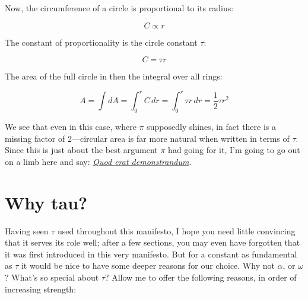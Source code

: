 \documentclass{article}
\begin{document}
Now, the circumference of a circle is proportional to its radius:

\[ C \propto r \]

\noindent The constant of proportionality is the circle constant $\tau$:

\[ C = \tau r \]

\noindent The area of the full circle in then the integral over all rings:

\[ A = \int dA = \int_0^r C\,dr = \int_0^r \tau r\,dr = \textstyle{\frac{1}{2}} \tau r^2 \]

\noindent 

We see that even in this case, where $\pi$ supposedly shines, in fact there is a missing factor of 2---circular area is far more natural when written in terms of $\tau$. Since this is just about the best argument $\pi$ had going for it, I'm going to go out on a limb here and say: \href{http://en.wikipedia.org/wiki/Q.E.D.}{\emph{Quod erat demonstrandum}}.




\section{Why tau?} %
\label{sec:why_tau}

Having seen $\tau$ used throughout this manifesto, I hope you need little convincing that it serves its role well; after a few sections, you may even have forgotten that it was first introduced in this very manifesto. But for a constant as fundamental as $\tau$ it would be nice to have some deeper reasons for our choice. Why not $\alpha$, or $\omega$? What's so special about $\tau$? Allow me to offer the following reasons, in order of increasing strength:
\end{document}

